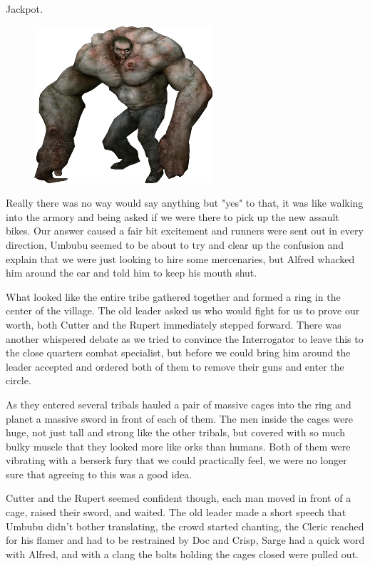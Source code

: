 Jackpot.

\begin{figure}
	\begin{center}
		\includegraphics[width=\figwidth]{pics/6/33.png}
	\end{center}
\end{figure}
Really there was no way would say anything but "yes" to that, it was like walking into the armory and being asked if we were there to pick up the new assault bikes. 
Our answer caused a fair bit excitement and runners were sent out in every direction, Umbubu seemed to be about to try and clear up the confusion and explain that we were just looking to hire some mercenaries, but Alfred whacked him around the ear and told him to keep his mouth shut.

What looked like the entire tribe gathered together and formed a ring in the center of the village. 
The old leader asked us who would fight for us to prove our worth, both Cutter and the Rupert immediately stepped forward. 
There was another whispered debate as we tried to convince the Interrogator to leave this to the close quarters combat specialist, but before we could bring him around the leader accepted and ordered both of them to remove their guns and enter the circle.

As they entered several tribals hauled a pair of massive cages into the ring and planet a massive sword in front of each of them. 
The men inside the cages were huge, not just tall and strong like the other tribals, but covered with so much bulky muscle that they looked more like orks than humans. 
Both of them were vibrating with a berserk fury that we could practically feel, we were no longer sure that agreeing to this was a good idea.

Cutter and the Rupert seemed confident though, each man moved in front of a cage, raised their sword, and waited. 
The old leader made a short speech that Umbubu didn't bother translating, the crowd started chanting, the Cleric reached for his flamer and had to be restrained by Doc and Crisp, Sarge had a quick word with Alfred, and with a clang the bolts holding the cages closed were pulled out.

